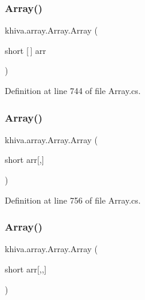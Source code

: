 \subsubsection{\texorpdfstring{Array()}{Array()}\hspace{0.1cm}{\footnotesize\ttfamily [37/46]}}
{\footnotesize\ttfamily khiva.\+array.\+Array.\+Array (\begin{DoxyParamCaption}\item[{short \mbox{[}$\,$\mbox{]}}]{arr }\end{DoxyParamCaption})\hspace{0.3cm}{\ttfamily [inline]}}



Definition at line 744 of file Array.\+cs.

\mbox{\label{classkhiva_1_1array_1_1_array_aba869352b5d7a3627d9134efe344f2ed}} 
\subsubsection{\texorpdfstring{Array()}{Array()}\hspace{0.1cm}{\footnotesize\ttfamily [38/46]}}
{\footnotesize\ttfamily khiva.\+array.\+Array.\+Array (\begin{DoxyParamCaption}\item[{short}]{arr\mbox{[},\mbox{]} }\end{DoxyParamCaption})\hspace{0.3cm}{\ttfamily [inline]}}



Definition at line 756 of file Array.\+cs.

\mbox{\label{classkhiva_1_1array_1_1_array_aeb67515d23739647eec9cd0b36e720a6}} 
\subsubsection{\texorpdfstring{Array()}{Array()}\hspace{0.1cm}{\footnotesize\ttfamily [39/46]}}
{\footnotesize\ttfamily khiva.\+array.\+Array.\+Array (\begin{DoxyParamCaption}\item[{short}]{arr\mbox{[},,\mbox{]} }\end{DoxyParamCaption})\hspace{0.3cm}{\ttfamily [inline]}}




